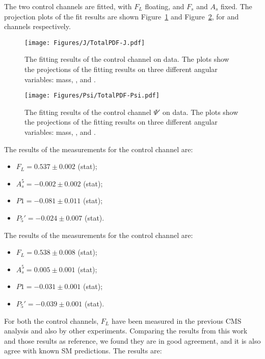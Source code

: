 The two control channels are fitted, with $F_L$ floating, and  $F_s$ and $A_s$ fixed.
The projection plots of the fit results are shown Figure~\ref{fig:result-bin4} and Figure~\ref{fig:result-bin6}, for \BtoKstJpsi and \BtoKstpsip channels respectively.

\begin{figure}[!hbt]
  \centering
  \texttt{[image: Figures/J/TotalPDF-J.pdf]}
  \caption{The fitting results of the control channel \cPJgy on data.
    The plots show the projections of the fitting results on three different angular variables: \PBz mass, \cTL, \cTK and \PHI.}
  \label{fig:result-bin4}
\end{figure}

\begin{figure}[!hbt]
  \centering
  \texttt{[image: Figures/Psi/TotalPDF-Psi.pdf]}
  \caption{The fitting results of the control channel $\Psi'$ on data.
    The plots show the projections of the fitting results on three different angular variables: \PBz mass, \cTL, \cTK and \PHI.}
  \label{fig:result-bin6}
\end{figure}

The results of the measurements for the control channel \BtoKstJpsi are:
\begin{itemize}
\item $F_L = 0.537 \pm 0.002$ (stat);
\item $A_s^5 = -0.002 \pm 0.002$ (stat);
\item $P1 = -0.081 \pm 0.011$ (stat);
\item $P_5' = -0.024 \pm 0.007$ (stat).
\end{itemize}

The results of the measurements for the control channel \BtoKstpsip are:
\begin{itemize}
\item $F_L = 0.538 \pm 0.008$ (stat);
\item $A_s^5 = 0.005 \pm 0.001$ (stat);
\item $P1 = -0.031 \pm 0.001$ (stat);
\item $P_5' = -0.039 \pm 0.001$ (stat).
\end{itemize}


For both the control channels, $F_L$ have been measured in the previous CMS analysis and also by other experiments.
Comparing the results from this work and those results as reference, we found they are in good agreement, and it is also agree with known SM predictions.
The results are:

